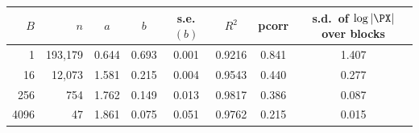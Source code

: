 \begin{tabular}{@{}rrcccccc@{}}
\toprule
$B$ & $n$ & $a$ & $b$ & s.e.$(b)$ & $R^{2}$ & pcorr & s.d.\ of $\log|\PX|$ over blocks\\
\midrule
1 & 193{,}179 & 0.644 & 0.693 & 0.001 & 0.9216 & 0.841 & 1.407\\
16 & 12{,}073 & 1.581 & 0.215 & 0.004 & 0.9543 & 0.440 & 0.277\\
256 & 754 & 1.762 & 0.149 & 0.013 & 0.9817 & 0.386 & 0.087\\
4096 & 47 & 1.861 & 0.075 & 0.051 & 0.9762 & 0.215 & 0.015\\
\bottomrule
\end{tabular}
